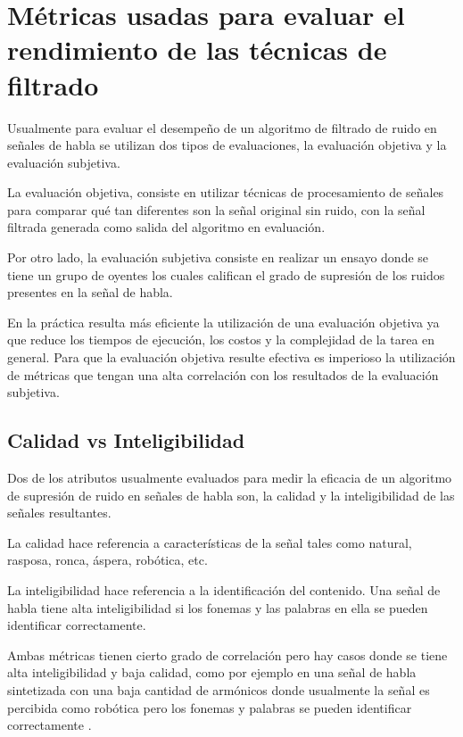 \section{Métricas usadas para evaluar el rendimiento de las técnicas de filtrado}
\label{sec:metrics}

Usualmente para evaluar el desempeño de un algoritmo de filtrado de ruido en señales de habla se utilizan dos tipos de evaluaciones, la evaluación objetiva y la evaluación subjetiva.

La evaluación objetiva, consiste en utilizar técnicas de procesamiento de señales para comparar qué tan diferentes son la señal original sin ruido, con la señal filtrada generada como salida del algoritmo en evaluación.

Por otro lado, la evaluación subjetiva consiste en realizar un ensayo donde se tiene un grupo de oyentes los cuales califican el grado de supresión de los ruidos presentes en la señal de habla.

En la práctica resulta más eficiente la utilización de una evaluación objetiva ya que reduce los tiempos de ejecución, los costos y la complejidad de la tarea en general. Para que la evaluación objetiva resulte efectiva es imperioso la utilización de métricas que tengan una alta correlación con los resultados de la evaluación subjetiva.

\subsection{Calidad vs Inteligibilidad}
\label{sec:intelligibility_vs_quality}

Dos de los atributos usualmente evaluados para medir la eficacia de un algoritmo de supresión de ruido en señales de habla son, la calidad y la inteligibilidad de las señales resultantes.

La calidad hace referencia a características de la señal tales como natural, rasposa, ronca, áspera, robótica, etc.

La inteligibilidad hace referencia a la identificación del contenido. Una señal de habla tiene alta inteligibilidad si los fonemas y las palabras en ella se pueden identificar correctamente.

Ambas métricas tienen cierto grado de correlación pero hay casos donde se tiene alta inteligibilidad y baja calidad, como por ejemplo en una señal de habla sintetizada con una baja cantidad de armónicos donde usualmente la señal es percibida como robótica pero los fonemas y palabras se pueden identificar correctamente \cite{philipos_book_speech_enhancement}. 

